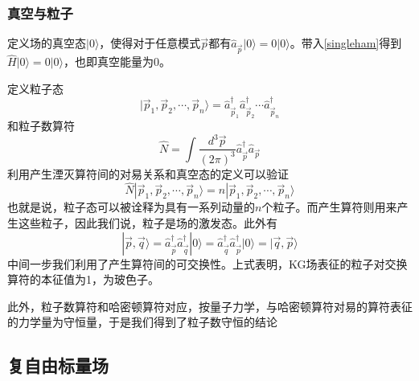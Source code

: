 \documentclass[a4paper,11pt]{ctexart}
\newcommand{\beq}{\begin{equation}}
\newcommand{\eeq}{\end{equation}}
\begin{document}
\subsubsection{真空与粒子}
定义场的真空态$|0\rangle$，使得对于任意模式$\vec{p}$都有$\hat{a}_{\vec{p}} |0\rangle = 0|0\rangle$。带入\cref{singleham}得到$\hat{H}|0\rangle = 0 |0\rangle$，也即真空能量为0。
\par
定义粒子态
\beq
|\vec{p}_1,\vec{p}_2,\cdots,\vec{p}_n\rangle = \hat{a}_{\vec{p}_1}^\dagger \hat{a}_{\vec{p}_2}^\dagger \cdots \hat{a}_{\vec{p}_n}^\dagger
\eeq
和粒子数算符
\beq
\hat{N} = \int \frac{d^3 \vec{p}}{(2\pi)^3} \hat{a}_{\vec{p}}^\dagger \hat{a}_{\vec{p}} 
\eeq
利用产生湮灭算符间的对易关系和真空态的定义可以验证
\beq
\hat{N} |\vec{p}_1,\vec{p}_2,\cdots,\vec{p}_n\rangle = n |\vec{p}_1,\vec{p}_2,\cdots,\vec{p}_n\rangle
\eeq
也就是说，粒子态可以被诠释为具有一系列动量的$n$个粒子。而产生算符则用来产生这些粒子，因此我们说，粒子是场的激发态。此外有
\beq
|\vec{p},\vec{q} \rangle = \hat{a}_{\vec{p}}^\dagger \hat{a}_{\vec{q}}^\dagger |0\rangle = \hat{a}_{\vec{q}}^\dagger \hat{a}_{\vec{p}}^\dagger |0\rangle = |\vec{q},\vec{p} \rangle
\eeq
中间一步我们利用了产生算符间的可交换性。上式表明，KG场表征的粒子对交换算符的本征值为1，为玻色子。
\par
此外，粒子数算符和哈密顿算符对应，按量子力学，与哈密顿算符对易的算符表征的力学量为守恒量，于是我们得到了粒子数守恒的结论

\subsection{复自由标量场}
\end{document}
